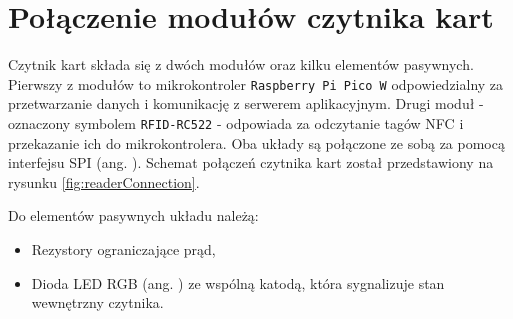 \section{Połączenie modułów czytnika kart}

Czytnik kart składa się z dwóch modułów oraz kilku elementów pasywnych. Pierwszy z modułów to mikrokontroler \texttt{Raspberry Pi Pico W} odpowiedzialny za przetwarzanie danych i komunikację z serwerem aplikacyjnym. Drugi moduł - oznaczony symbolem \texttt{RFID-RC522} - odpowiada za odczytanie tagów NFC i przekazanie ich do mikrokontrolera. Oba układy są połączone ze sobą za pomocą interfejsu SPI (ang. ). Schemat połączeń czytnika kart został przedstawiony na rysunku \ref{fig:readerConnection}.

Do elementów pasywnych układu należą:
\begin{itemize}
    \item Rezystory ograniczające prąd,
    \item Dioda LED RGB (ang. ) ze wspólną katodą, która sygnalizuje stan wewnętrzny czytnika.
\end{itemize}

